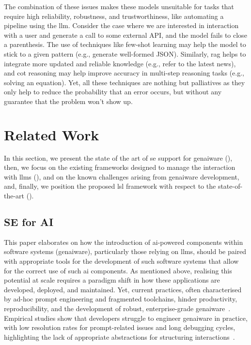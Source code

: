 \documentclass[manuscript,screen]{acmart}
\begin{document}
The combination of these issues makes these models unsuitable for tasks that require high reliability, robustness, and trustworthiness, like automating a pipeline using the \ac{llm}.
Consider the case where we are interested in interaction with a user and generate a call to some external API, and the model fails to close a parenthesis.
The use of techniques like few-shot learning may help the model to stick to a given pattern (e.g., generate well-formed JSON).
Similarly, \ac{rag} helps to integrate more updated and reliable knowledge (e.g., refer to the latest news), and \ac{cot} reasoning may help improve accuracy in multi-step reasoning tasks (e.g., solving an equation).
Yet, all these techniques are nothing but palliatives as they only help to reduce the probability that an error occurs, but without any guarantee that the problem won't show up.

\section{Related Work}
\label{sec:sota}

In this section, we present the state of the art of \ac{se} support for \ac{genai}ware (), then, we focus on the existing frameworks designed to manage the interaction with \acp{llm} (), and on the known challenges arising from \ac{genai}ware development, and, finally, we position the proposed \ac{lsl} framework with respect to the state-of-the-art ().

\subsection{SE for AI}
\label{sec:sephorai}

This paper elaborates on how the introduction of \ac{ai}-powered components within software systems (\ac{genai}ware), particularly those relying on \acp{llm}, should be paired with appropriate tools for the development of such software systems that allow for the correct use of such \ac{ai} components.
As mentioned above, realising this potential at scale requires a paradigm shift in how these applications are developed, deployed, and maintained.
Yet, current practices, often characterised by ad-hoc prompt engineering and fragmented toolchains, hinder productivity, reproducibility, and the development of robust, enterprise-grade \ac{genai}ware~\cite{DBLP:conf/cain/BarnettKTB024,DBLP:conf/icse-seip/NaharKBPZB25,DBLP:conf/icse/Shao0S00025}.
Empirical studies show that developers struggle to engineer \ac{genai}ware in practice, with low resolution rates for prompt-related issues and long debugging cycles, highlighting the lack of appropriate abstractions for structuring interactions~\cite{DBLP:journals/tosem/ChenGCZL25,DBLP:journals/corr/abs-2503-02400,DBLP:journals/pacmse/LiangLRM25}.
\end{document}
